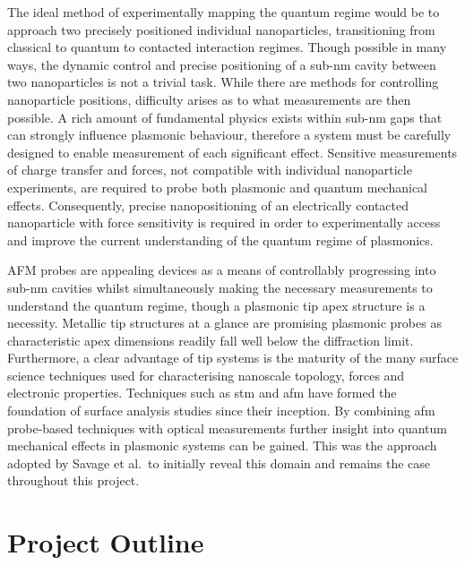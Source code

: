 \documentclass[12pt, a4paper, twoside]{book}
\begin{document}
The ideal method of experimentally mapping the quantum regime would be to approach two precisely positioned individual nanoparticles, transitioning from classical to quantum to contacted interaction regimes. Though possible in many ways, the dynamic control and precise positioning of a sub-nm cavity between two nanoparticles is not a trivial task. While there are methods for controlling nanoparticle positions, difficulty arises as to what measurements are then possible. A rich amount of fundamental physics exists within sub-nm gaps that can strongly influence plasmonic behaviour, therefore a system must be carefully designed to enable measurement of each significant effect. Sensitive measurements of charge transfer and forces, not compatible with individual nanoparticle experiments, are required to probe both plasmonic and quantum mechanical effects. Consequently, precise nanopositioning of an electrically contacted nanoparticle with force sensitivity is required in order to experimentally access and improve the current understanding of the quantum regime of plasmonics.

AFM probes are appealing devices as a means of controllably progressing into sub-nm cavities whilst simultaneously making the necessary measurements to understand the quantum regime, though a plasmonic tip apex structure is a necessity. Metallic tip structures at a glance are promising plasmonic probes as  characteristic apex dimensions readily fall well below the diffraction limit. Furthermore, a clear advantage of tip systems is the maturity of the many surface science techniques used for characterising nanoscale topology, forces and electronic properties. Techniques such as \gls{stm} \cite{binnig1982} and \gls{afm} \cite{binnig1986} have formed the foundation of surface analysis studies since their inception. By combining \gls{afm} probe-based techniques with optical measurements further insight into quantum mechanical effects in plasmonic systems can be gained. This was the approach adopted by Savage et al.\ to initially reveal this domain \cite{savage2012} and remains the case throughout this project.

\section{Project Outline}
\end{document}
